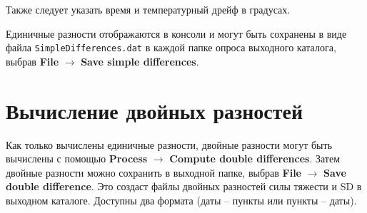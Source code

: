 Также следует указать время и температурный дрейф в градусах.

Единичные разности отображаются в консоли и могут быть сохранены в виде файла
\verb|SimpleDifferences.dat| в каждой папке опроса выходного каталога, выбрав
\textbf{File} $\rightarrow$ \textbf{Save simple differences}.

\section[Вычисление двойных разностей]{Вычисление двойных разностей}
\label{sec:compute_double_differences}

Как только вычислены единичные разности, двойные разности могут быть вычислены с
помощью \textbf{Process} $\rightarrow$ \textbf{Compute double differences}.
Затем двойные разности можно сохранить в выходной папке, выбрав \textbf{File}
$\rightarrow$ \textbf{Save double difference}. Это создаст файлы двойных
разностей силы тяжести и SD в выходном каталоге. Доступны два формата (даты --
пункты или пункты -- даты).